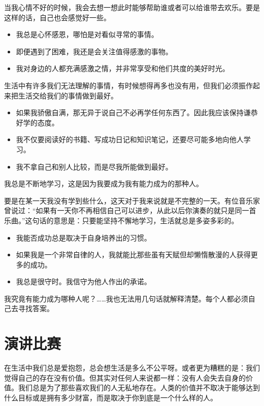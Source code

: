 \documentclass{ctexart}
\begin{document}
当我心情不好的时候，我会去想一想此时能够帮助谁或者可以给谁带去欢乐。要是这样的话，自己也会感觉好一些。

\begin{itemize}
    \item 我总是心怀感恩，哪怕是对看似寻常的事情。
    \item 即便遇到了困难，我还是会关注值得感激的事物。
    \item 我对身边的人都充满感激之情，并非常享受和他们共度的美好时光。
\end{itemize}

生活中有许多我们无法理解的事情，有时候想得再多也没有用，但我们必须振作起来把生活交给我们的事情做到最好。

\begin{itemize}
    \item 如果我骄傲自满，那无异于说自己不必再学任何东西了。因此我应该保持谦恭好学的态度。
    \item 我不仅要阅读好的书籍、写成功日记和知识笔记，还要尽可能多地向他人学习。
    \item 我不拿自己和别人比较，而是尽我所能做到最好。
\end{itemize}

我总是不断地学习，这是因为我要成为我有能力成为的那种人。

要是在某一天我没有学到些什么，这天对于我来说就是不完整的一天。有位音乐家曾说过：“如果有一天你不再相信自己可以进步，从此以后你演奏的就只是同一首乐曲。”这句话的意思是：只要能坚持不懈地学习，生活就总是多姿多彩的。

\begin{itemize}
    \item 我能否成功总是取决于自身培养出的习惯。
    \item 如果我是一个非常自律的人，我就能比那些虽有天赋但却懒惰散漫的人获得更多的成功。
    \item 我总是很守时。我信守为他人作出的承诺。
\end{itemize}

我究竟有能力成为哪种人呢？……我也无法用几句话就解释清楚。每个人都必须自己去寻找答案。

\section{演讲比赛}

在生活中我们总是爱抱怨，总会想生活是多么不公平呀。或者更为糟糕的是：我们觉得自己的存在没有价值。但其实对任何人来说都一样：没有人会失去自身的价值。我们总是为了那些喜欢我们的人无私地存在。人类的价值并不取决于能够达到什么目标或是拥有多少财富，而是取决于你到底是一个什么样的人。
\end{document}
